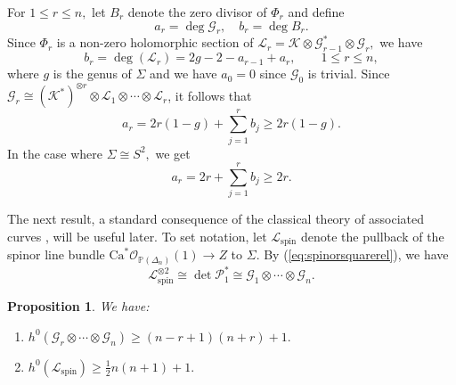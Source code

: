 \documentclass[11pt]{article}
\newtheorem{prop}[theorem]{Proposition}
\theoremstyle{definition}
\numberwithin{equation}{section}
\begin{document}
\indent \indent For $1 \leq r \leq n,$ let $B_r$ denote the zero divisor of $\Phi_r$ and define
\begin{equation*}
	a_r = \deg \mathcal{G}_r, \quad b_r = \deg B_r.
\end{equation*}
Since $\Phi_r$ is a non-zero holomorphic section of $\mathcal{L}_r = \mathcal{K} \otimes \mathcal{G}^{*}_{r-1} \otimes \mathcal{G}_r,$ we have
\begin{equation*}
	b_r = \deg(\mathcal{L}_r) = 2g - 2 - a_{r-1} + a_r, \qquad 1 \leq r \leq n,
\end{equation*}
where $g$ is the genus of $\Sigma$ and we have $a_0 = 0$ since $\mathcal{G}_0$ is trivial. Since $\mathcal{G}_r \cong (\mathcal{K}^{*})^{\otimes r} \otimes \mathcal{L}_1 \otimes \cdots \otimes \mathcal{L}_r$, it follows that
\begin{equation}\label{eq:generaldegbound}
	a_r = 2r(1-g) + \sum_{j=1}^r b_j \geq 2r(1-g).
\end{equation}
In the case where $\Sigma \cong S^2,$ we get
\begin{equation}\label{eq:spheredegbound}
	a_r = 2r + \sum_{j=1}^r b_j \geq 2r.
\end{equation}

The next result, a standard consequence of the classical theory of associated curves \cite{Brycurvenotes19,GriffHarrBook78}, will be useful later. To set notation, let $\mathcal{L}_{\mathrm{spin}}$ denote the pullback of the spinor line bundle $\mathrm{Ca}^* \mathcal{O}_{\mathbb{P}(\Delta_n)}(1) \to Z$ to $\Sigma$. By (\ref{eq:spinorsquarerel}), we have 
\begin{equation}\label{eq:spinorlinesquare}
    \mathcal{L}_{\mathrm{spin}}^{\otimes 2} \cong \det \mathcal{P}_1^* \cong \mathcal{G}_1 \otimes \cdots \otimes \mathcal{G}_n.
\end{equation}


\begin{prop}\label{prop:h0lowerbound}
    We have:
    \begin{enumerate}[label=(\alph*)]
        \item  $h^0(\mathcal{G}_r \otimes \cdots \otimes \mathcal{G}_n) \geq (n-r+1)(n+r)+1.$
        \item $h^0(\mathcal{L}_{\mathrm{spin}}) \geq \tfrac{1}{2}n(n+1)+1.$
    \end{enumerate}
\end{prop}
\end{document}
